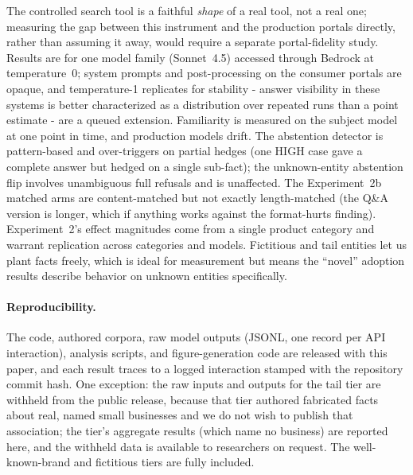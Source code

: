 \documentclass[11pt]{article}
\begin{document}
The controlled search tool is a faithful \emph{shape} of a real tool, not a real one; measuring the
gap between this instrument and the production portals directly, rather than assuming it away, would
require a separate portal-fidelity study. Results are for one model family (Sonnet~4.5) accessed
through Bedrock at temperature~0; system prompts and post-processing on the consumer portals are
opaque, and temperature-1 replicates for stability - answer visibility in these systems is better
characterized as a distribution over repeated runs than a point estimate \citep{schulte2026dont} - are
a queued extension. Familiarity is measured
on the subject model at one point in time, and production models drift. The abstention detector is
pattern-based and over-triggers on partial hedges (one HIGH case gave a complete answer but hedged
on a single sub-fact); the unknown-entity abstention flip involves unambiguous full refusals and is
unaffected. The Experiment~2b matched arms are content-matched but not exactly length-matched (the
Q\&A version is longer, which if anything works against the format-hurts finding). Experiment~2's
effect magnitudes come from a single product category and warrant replication across categories and
models. Fictitious and tail entities let us
plant facts freely, which is ideal for measurement but means the ``novel'' adoption results describe
behavior on unknown entities specifically.

\paragraph{Reproducibility.}
The code, authored corpora, raw model outputs (JSONL, one record per API interaction), analysis
scripts, and figure-generation code are released with this paper, and each result traces to a logged
interaction stamped with the repository commit hash. One exception: the raw inputs and outputs for
the tail tier are withheld from the public release, because that tier authored fabricated facts about
real, named small businesses and we do not wish to publish that association; the tier's aggregate
results (which name no business) are reported here, and the withheld data is available to researchers
on request. The well-known-brand and fictitious tiers are fully included.



\end{document}
